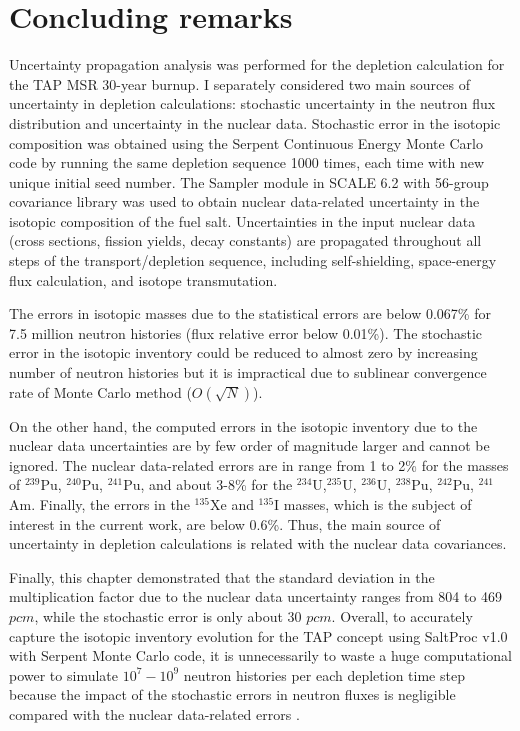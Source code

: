 \section{Concluding remarks}
Uncertainty propagation analysis was performed for the depletion calculation 
for the \gls{TAP} \gls{MSR} 30-year burnup. I separately considered two main 
sources of uncertainty in depletion calculations: stochastic uncertainty in 
the neutron flux distribution and uncertainty in the nuclear data. Stochastic 
error in the isotopic composition was obtained using the Serpent Continuous 
Energy Monte Carlo code by running the same depletion sequence 1000 times, 
each time with new unique initial seed number. The Sampler module in SCALE 6.2 
with 56-group covariance library was used to obtain nuclear data-related 
uncertainty in the isotopic composition of the fuel salt. Uncertainties in the 
input nuclear data (cross sections, fission yields, decay constants) are 
propagated throughout all steps of the transport/depletion sequence, including 
self-shielding, space-energy flux calculation, and isotope transmutation. 

The errors in isotopic masses due to the statistical errors are below 0.067\% 
for 7.5 million neutron histories (flux relative error below 0.01\%). The 
stochastic error in the isotopic inventory could be reduced to almost zero by 
increasing number of neutron histories but it is impractical due to sublinear 
convergence rate of Monte Carlo method ($O(\sqrt{N})$).

On the other hand, the computed errors in the isotopic inventory due to the 
nuclear data uncertainties are by few order of magnitude larger and cannot be 
ignored. The nuclear data-related errors are in range from 1 to 2\% for the 
masses of $^{239}$Pu, $^{240}$Pu, $^{241}$Pu, and about 3-8\% for the 
$^{234}$U,$^{235}$U, $^{236}$U, $^{238}$Pu, $^{242}$Pu, $^{241}$Am. Finally, 
the errors in the $^{135}$Xe and $^{135}$I masses, which is the subject of 
interest in the current work, are below 0.6\%. Thus, the main source of 
uncertainty in depletion calculations is related with the nuclear data 
covariances.

Finally, this chapter demonstrated that the standard deviation in the 
multiplication factor due to the nuclear data uncertainty ranges from 804 to 
469 $pcm$, while the stochastic error is only about 30 $pcm$. Overall, to 
accurately capture the isotopic inventory evolution for the \gls{TAP} concept 
using SaltProc v1.0 with Serpent Monte Carlo code, it is unnecessarily to 
waste a huge computational power to simulate $10^7-10^9$ neutron histories per 
each depletion time step because the impact of the stochastic errors in 
neutron fluxes is negligible compared with the nuclear data-related errors .